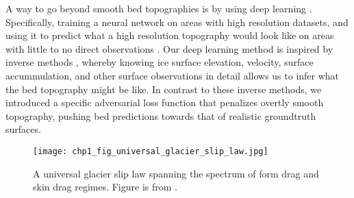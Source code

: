 A way to go beyond smooth bed topographies is by using deep learning \citep[see][for a review]{GoodfellowDeeplearning2016}.
Specifically, training a neural network on areas with high resolution datasets, and using it to predict what a high resolution topography would look like on areas with little to no direct observations \citep[Chapter 2,][]{LeongDeepBedMapdeepneural2020}. %
Our deep learning method is inspired by inverse methods \citep{GudmundssonInverseMethodsGlaciology2011}, whereby knowing ice surface elevation, velocity, surface accummulation, and other surface observations in detail allows us to infer what the bed topography might be like.
In contrast to these inverse methods, we introduced a specific adversarial loss function \citep{GoodfellowGenerativeAdversarialNetworks2014} that penalizes overtly smooth topography, pushing bed predictions towards that of realistic groundtruth surfaces.

\begin{figure}[htbp]
  \texttt{[image: chp1\_fig\_universal\_glacier\_slip\_law.jpg]}
  \caption[Universal glacier slip law]{
    A universal glacier slip law spanning the spectrum of form drag and skin drag regimes.
    Figure is from \citet{Minchewuniversalglacierslip2020}.
  }
  \label{fig:1.3}
\end{figure}

